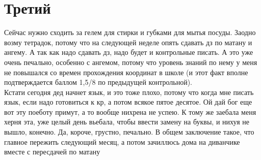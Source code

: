 \documentclass[a4paper, 12pt]{article}
\begin{document}
\section{Третий}
Сейчас нужно сходить за гелем для стирки и губками для мытья посуды. Заодно возму тетрадок,                    потому что на следующей неделе опять сдавать дз по матану и ангему. А так как надо сдавать дз, надо будет и                     контрольные писать. А это уже очень печально, особенно с ангемом, потому что уровень знаний по нему у меня не                    повышался со времен прохождения координат в школе (и этот факт вполне подтверждается баллом 1,5/8 по предыдущей                    контрольной).\\Кстати сегодня дед начнет язык, и это тоже плохо, потому что когда мне писать язык, если надо готовиться                     к кр, а потом всякое пятое десятое. Ой дай бог еще вот эту поеботу примут, а то вообще нихрена не успею. К тому же заебала                     меня херня эта, уже целый день вьебала, чтобы ввести замену на буквы, и нихуя не вышло, конечно. Да, короче, грустно,                     печально. В общем заключение такое, что главное пережить следующий месяц, а потом зачиллюсь дома на диванчике вместе                     с пересдачей по матану
\end{document}
